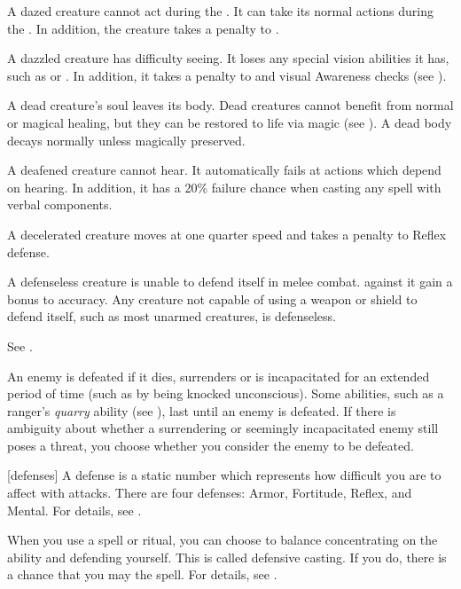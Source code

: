  A dazed creature cannot act during the .
It can take its normal actions during the .
In addition, the creature takes a  penalty to .

 A dazzled creature has difficulty seeing.
It loses any special vision abilities it has, such as  or .
In addition, it takes a  penalty to  and visual Awareness checks (see ).

 A dead creature's soul leaves its body. Dead creatures cannot benefit from normal or magical healing, but they can be restored to life via magic (see ). A dead body decays normally unless magically preserved.

 A deafened creature cannot hear. It automatically fails at actions which depend on hearing. In addition, it has a 20\% failure chance when casting any spell with verbal components.

 A decelerated creature moves at one quarter speed and takes a  penalty to Reflex defense.

 A defenseless creature is unable to defend itself in melee combat.
 against it gain a  bonus to accuracy.
Any creature not capable of using a weapon or shield to defend itself, such as most unarmed creatures, is defenseless.

 See .

 An enemy is defeated if it dies, surrenders or is incapacitated for an extended period of time (such as by being knocked unconscious).
Some abilities, such as a ranger's \textit{quarry} ability (see ), last until an enemy is defeated.
If there is ambiguity about whether a surrendering or seemingly incapacitated enemy still poses a threat, you choose whether you consider the enemy to be defeated.

[defenses] A defense is a static number which represents how difficult you are to affect with attacks.
There are four defenses: Armor, Fortitude, Reflex, and Mental.
For details, see .

 When you use a spell or ritual, you can choose to balance concentrating on the ability and defending yourself.
This is called defensive casting.
If you do, there is a chance that you may  the spell.
For details, see .

